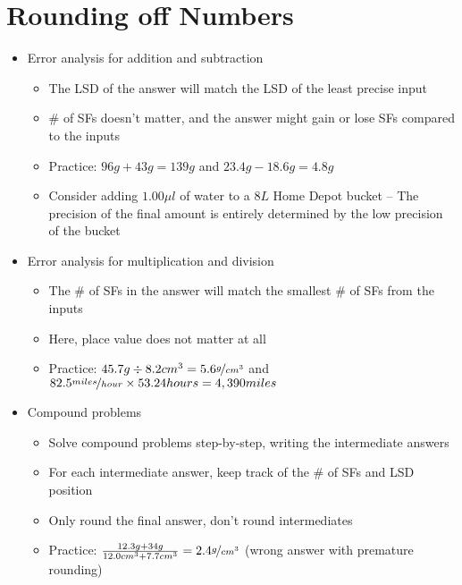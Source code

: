\documentclass[12pt, openany, letterpaper]{memoir}
\begin{document}
\section{Rounding off Numbers}
\begin{itemize}
	\item Error analysis for addition and subtraction
	\begin{itemize}
		\item The LSD of the answer will match the LSD of the least precise input
		\item \# of SFs doesn't matter, and the answer might gain or lose SFs compared to the inputs 
		\item Practice: $96g+43g=139g$ \hspace{1em}and\hspace{1em} $23.4g-18.6g=4.8g$
		\item Consider adding $1.00\mu l$ of water to a $8L$ Home Depot bucket -- The precision of the final amount is entirely determined by the low precision of the bucket 
	\end{itemize}
	\item Error analysis for multiplication and division
	\begin{itemize}
		\item The \# of SFs in the answer will match the smallest \# of SFs from the inputs
		\item Here, place value does not matter at all
		\item Practice: $45.7g \div 8.2cm^3 = 5.6\nicefrac{g}{cm^3}$ \hspace{1em}and\hspace{1em} $82.5\nicefrac{miles}{hour}\times53.24hours=4,390miles$
	\end{itemize}
	\item Compound problems
	\begin{itemize}
		\item Solve compound problems step-by-step, writing the intermediate answers
		\item For each intermediate answer, keep track of the \# of SFs and LSD position
		\item Only round the final answer, don't round intermediates
		\item Practice: $\frac{12.3g+34g}{12.0cm^3+7.7cm^3}=2.4\nicefrac{g}{cm^3}$ (wrong answer with premature rounding)
	\end{itemize}
\end{itemize}
\end{document}
